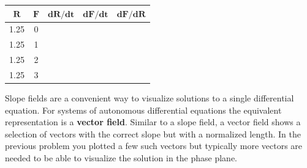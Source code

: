 \begin{enumerate}
\begin{enumerate}
\begin{center}
\renewcommand{\arraystretch}{2}
\begin{tabular}{|c|c|c|c|c|}
\hline
$\mathbf{R}$&	$\mathbf{F}$&	$\mathbf{dR/dt}$&	$\mathbf{dF/dt}$&	$\mathbf{dF/dR}$\\\hline
1.25	&0&&&\\\hline			
1.25	&1	&&&\\\hline		
1.25	&2	&&&\\\hline		
1.25	&3	&&&\\\hline	
\end{tabular}

\end{center}
\end{enumerate}
\end{enumerate}
\clearpage


Slope fields are a convenient way to visualize solutions to a single differential equation. For systems of autonomous differential equations the equivalent representation is a \textbf{vector field}. Similar to a slope field, a vector field shows a selection of vectors with the correct slope but with a normalized length. In the previous problem you plotted a few such vectors but typically more vectors are needed to be able to visualize the solution in the phase plane.

